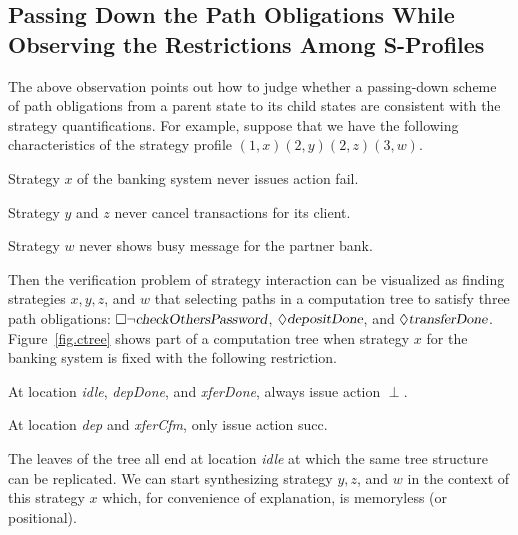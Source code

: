 \subsection{Passing Down the Path Obligations While Observing the Restrictions Among S-Profiles}
The above observation points out how to judge whether a passing-down scheme of path obligations from a parent state to its child states are consistent with the strategy quantifications.  
For example, suppose that we have the following characteristics of the strategy profile $(1,x)(2,y)(2,z)(3,w)$.
\begin{list1} 
\item Strategy $x$ of the banking system never issues action fail. 
\item Strategy $y$ and $z$ never cancel transactions for its client. 
\item Strategy $w$ never shows busy message for the partner bank. 
\end{list1} 
Then the verification problem of strategy interaction can be visualized as finding strategies $x,y,z$, and $w$ that selecting paths in a computation tree to satisfy three path obligations: 
$\Box \neg \mbox{\sl checkOthersPassword}$, 
$\Diamond \mbox{\sl depositDone}$, and $\Diamond\mbox{\sl transferDone}$.  
Figure~\ref{fig.ctree} shows part of a computation tree when strategy $x$ for the banking system is fixed with the following restriction. 
\begin{figure*}[t] 
\begin{center} 
\caption{Part of the computation tree of the banking system} 
\label{fig.ctree}
\end{center} 
\end{figure*} 
\begin{list1} 
\item At location {\em idle}, {\em depDone}, and {\em xferDone}, always issue action $\perp$.  
\item At location {\em dep} and {\em xferCfm}, only issue action {\sf succ}.  
\end{list1}
The leaves of the tree all end at location {\em idle} at which the same tree structure can be replicated.
We can start synthesizing strategy $y,z$, and $w$ in the context of this strategy $x$ which, for convenience of explanation, is memoryless (or positional). 

